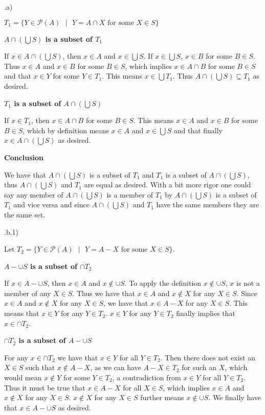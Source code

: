 \documentclass{article}
\begin{document}
.a)

$T_1 = \{Y \in \mathcal{P}(A) \text{ } | \text{ } Y = A \cap X \text{ for some } X \in S\}$

\bigskip
\textbf{$A \cap (\bigcup S)$ is a subset of $T_1$}
\bigskip

If $x \in A \cap (\bigcup S)$, then $x \in A$ and $x \in \bigcup S$. If $x \in \bigcup S$, $x \in B$ for some $B \in S$. Thus $x \in A$ and $x \in B$ for some $B \in S$, which implies $x \in A \cap B$ for some $B \in S$ and that $x \in Y$ for some $Y \in T_1$. This means $x \in \bigcup T_1$. Thus $A \cap (\bigcup S) \subseteq T_1$ as desired.

\bigskip
\textbf{$T_1$ is a subset of $A \cap (\bigcup S)$}
\bigskip

If $x \in T_1$, then $x \in A \cap B$ for some $B \in S$. This means $x \in A$ and $x \in B$ for some $B \in S$, which by definition means $x \in A$ and $x \in \bigcup S$ and that finally $x \in A \cap (\bigcup S)$ as desired.

\bigskip
\textbf{Conclusion}
\bigskip

We have that $A \cap (\bigcup S)$ is a subset of $T_1$ and $T_1$ is a subset of $A \cap (\bigcup S)$, thus $A \cap (\bigcup S)$ and $T_1$ are equal as desired. With a bit more rigor one could say any member of $A \cap (\bigcup S)$ is a member of $T_1$ by $A \cap (\bigcup S)$ is a subset of $T_1$ and vice versa and since $A \cap (\bigcup S)$ and $T_1$ have the same members they are the same set.

.b.1)

Let $T_2 = \{Y \in \mathcal{P}(A) \text{ } | \text{ } Y = A - X \text { for some } X \in S\}$.

\bigskip
\textbf{$A - \cup S$ is a subset of $\cap T_2$}
\bigskip

If $x \in A - \cup S$, then $x \in A$ and $x \notin \cup S$. To apply the definition $x \notin \cup S$, $x$ is not a member of any $X \in S$. Thus we have that $x \in A$ and $x \notin X$ for any $X \in S$. Since $x \in A$ and $x \notin X$ for any $X \in S$, we have that $x \in A - X$ for any $X \in S$. This means that $x \in Y$ for any $Y \in T_2$. $x \in Y$ for any $Y \in T_2$ finally implies that $x \in \cap T_2$.

\bigskip
\textbf{$\cap T_2$ is a subset of $A - \cup S$}
\bigskip

For any $x \in \cap T_2$ we have that $x \in Y$ for all $Y \in T_2$. Then there does not exist an $X \in S$ such that $x \notin A - X$, as we can have $A - X \in T_2$ for such an $X$, which would mean $x \notin Y$ for some $Y \in T_2$, a contradiction from $x \in Y$ for all $Y \in T_2$. Thus it must be true that $x \in A - X$ for all $X \in S$, which implies $x \in A$ and $x \notin X$ for any $X \in S$. $x \notin X$ for any $X \in S$ further means $x \notin \cup S$. We finally have that $x \in A - \cup S$ as desired.
\end{document}
